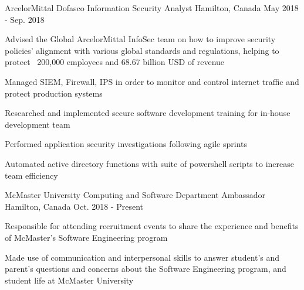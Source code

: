 

\begin{cventries}

\vspace{-2mm}
  \cventry
    {ArcelorMittal Dofasco} %
    {Information Security Analyst} %
    {Hamilton, Canada} %
    {May 2018 - Sep. 2018} %
    {
      \begin{cvitems} %
        \item {Advised the Global ArcelorMittal InfoSec team on how to improve security policies' alignment 
with various global standards and regulations, helping to protect ~200,000 employees and 68.67 
billion USD of revenue}
    	\item {Managed SIEM, Firewall, IPS in order to monitor and control internet traffic and protect production systems}
    	\item {Researched and implemented secure software development training for in-house development team}
    	\item {Performed application security investigations following agile sprints}
	\item {Automated active directory functions with suite of powershell scripts to increase team efficiency}
      \end{cvitems}
    }

  \cventry
    {McMaster University} %
    {Computing and Software Department Ambassador} %
    {Hamilton, Canada} %
    {Oct. 2018 - Present} %
    {
      \begin{cvitems} %
  \item{Responsible for attending recruitment events to share the experience and benefits of McMaster's Software Engineering program}
  \item{Made use of communication and interpersonal skills to answer student's and parent's questions and concerns about the Software Engineering program, and student life at McMaster University }
      \end{cvitems}
    }



\end{cventries}

